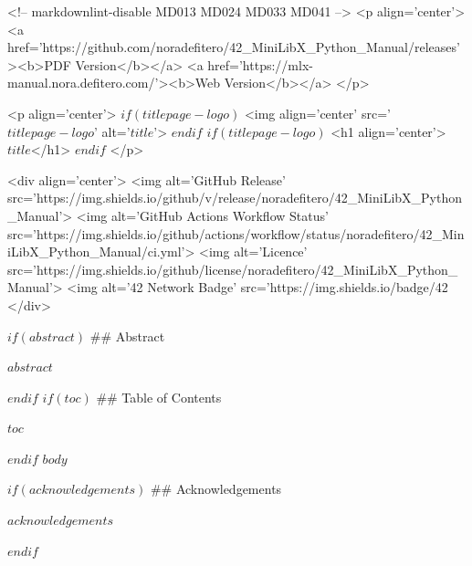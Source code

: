 <!-- markdownlint-disable MD013 MD024 MD033 MD041 -->
<p align='center'>
 <a href='https://github.com/noradefitero/42_MiniLibX_Python_Manual/releases'><b>PDF Version</b></a>
<a href='https://mlx-manual.nora.defitero.com/'><b>Web Version</b></a>
</p>

<p align='center'>
$if(titlepage-logo)$
<img align='center' src='$titlepage-logo$' alt='$title$'>
$endif$
$if(titlepage-logo)$
    <h1 align='center'>$title$</h1>
$endif$
</p>

<div align='center'>
    <img alt='GitHub Release' src='https://img.shields.io/github/v/release/noradefitero/42_MiniLibX_Python_Manual'>
    <img alt='GitHub Actions Workflow Status' src='https://img.shields.io/github/actions/workflow/status/noradefitero/42_MiniLibX_Python_Manual/ci.yml'>
    <img alt='Licence' src='https://img.shields.io/github/license/noradefitero/42_MiniLibX_Python_Manual'>
    <img alt='42 Network Badge' src='https://img.shields.io/badge/42%
</div>

$if(abstract)$
## Abstract

$abstract$

$endif$
$if(toc)$
## Table of Contents

$toc$

$endif$
$body$

$if(acknowledgements)$
## Acknowledgements

$acknowledgements$

$endif$
